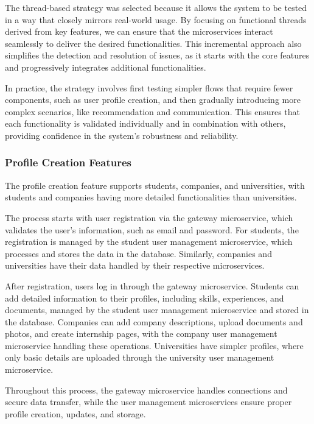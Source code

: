The thread-based strategy was selected because it allows the system to be tested in a way that
closely mirrors real-world usage. By focusing on functional threads derived from key features,
we can ensure that the microservices interact seamlessly to deliver the desired functionalities.
This incremental approach also simplifies the detection and resolution of issues, as it starts
with the core features and progressively integrates additional functionalities.

In practice, the strategy involves first testing simpler flows that require fewer components,
such as user profile creation, and then gradually introducing more complex scenarios,
like recommendation and communication. This ensures that each functionality is validated
individually and in combination with others, providing confidence in the system’s robustness
and reliability.

\subsubsection{Profile Creation Features}

The profile creation feature supports students, companies, and universities, with students and
companies having more detailed functionalities than universities.

The process starts with user registration via the gateway microservice, which validates the
user’s information, such as email and password. For students, the registration is managed by
the student user management microservice, which processes and stores the data in the database.
Similarly, companies and universities have their data handled by their respective microservices.

After registration, users log in through the gateway microservice. Students can add detailed
information to their profiles, including skills, experiences, and documents, managed by the
student user management microservice and stored in the database. Companies can add company
descriptions, upload documents and photos, and create internship pages, with the company
user management microservice handling these operations. Universities have simpler profiles,
where only basic details are uploaded through the university user management microservice.

Throughout this process, the gateway microservice handles connections and secure data
transfer, while the user management microservices ensure proper profile creation, updates,
and storage.

